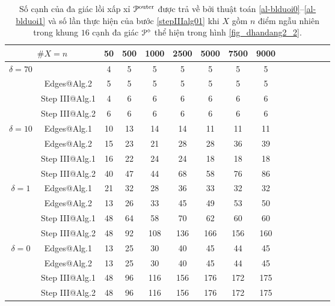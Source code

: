 \documentclass[12pt,a4paper,openany,oneside]{report}
\begin{document}
\begin{table}[ht]
	\begin{center}\renewcommand{\arraystretch}{1.2}\small
		\setlength\tabcolsep{0.05cm}
	\begin{tabular}{|c|c||c|c|c|c|c|c|c|c|c|c|c|c|c|}
		\hline
		\multicolumn {2}{|c||}{\footnotesize $\#X=n$}  & 50& 500& 1000& 2500& 5000& 7500& 9000\\ 
		\hline		
		\hline
		{ $\delta = 70$}
		
		& \text{Edges@Alg.1}  &  4& 5& 5& 5& 5& 5& 5 \\
		
		& Edges@Alg.2  &   5& 5& 5& 5& 5& 5& 5\\
		
		& Step III@Alg.1  &4 &6 &6 &6 &6 &6 &6  \\
		
		& Step III@Alg.2 &6 &6 &6 &6 &6 &6 &6  \\
		\hline
		{ $\delta = 10$}
		
		& Edges@Alg.1  & 10 & 13 &14& 14&11&11&11 \\
		
		& Edges@Alg.2 &15&23&21&28&28&36&39\\
		
		& Step III@Alg.1 &16&22&24&24&18&18&18 \\
		
		& Step III@Alg.2&40&47&44&68&58&76&86  \\
		\hline
		{ $\delta = 1$}
		
		& Edges@Alg.1  &21&32&28&36&33&32&32 \\
		
		& Edges@Alg.2 &13&26&33&45&49&53&50 \\
		
		& Step III@Alg.1 &48&64&58&70&62&60&60 \\
		
		& Step III@Alg.2&48&92&108&136&166&156&160   \\
		\hline
		{ $\delta = 0$}
		
		& Edges@Alg.1 &13&25&30&40&45&44&45 \\
		
		& Edges@Alg.2&13&25&30&40&45&44&45  \\
		
		& Step III@Alg.1 &48 &96 &116 &156 &176 &172 &175 \\
		
		& Step III@Alg.2&48 &96 &116 &156 &176 &172 &175   \\
		\hline
	\end{tabular}
		\caption{Số cạnh của đa giác lồi xấp xỉ ${\cal P}^{\rm outer}$ được trả về bởi thuật toán \ref{al-blduoi0}--\ref{al-blduoi1} và số lần thực hiện của bước \ref{stepIIIalg01} khi $X$ gồm $n$ điểm ngẫu nhiên trong khung $16$ cạnh đa giác ${\cal P}^\diamond$ thể hiện trong hình \ref{fig_dhandang2_2}.}
		\label{table01}
	\end{center}
\end{table} 	
\end{document}
